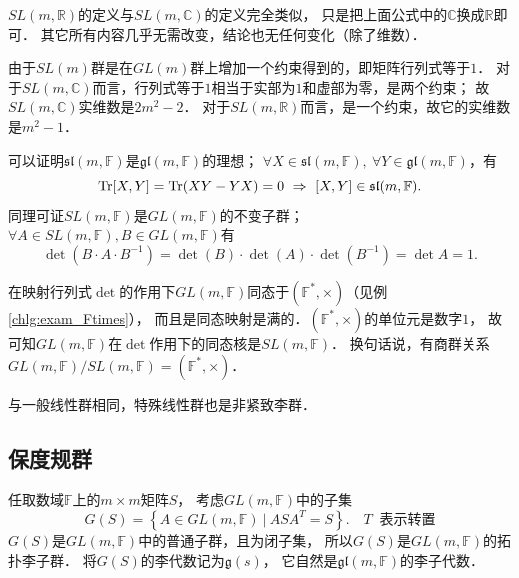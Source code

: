 

$SL(m,\mathbb{R})$的定义与$SL(m,\mathbb{C})$的定义完全类似，
只是把上面公式中的$\mathbb{C}$换成$\mathbb{R}$即可．
其它所有内容几乎无需改变，结论也无任何变化（除了维数）．

由于$SL(m)$群是在$GL(m)$群上增加一个约束得到的，即矩阵行列式等于$1$．
对于$SL(m,\mathbb{C})$而言，行列式等于$1$相当于实部为$1$和虚部为零，是两个约束；
故$SL(m,\mathbb{C})$实维数是$2m^2 -2$．
对于$SL(m,\mathbb{R})$而言，是一个约束，故它的实维数是$m^2-1$．

可以证明$\mathfrak{sl}(m,\mathbb{F})$是$\mathfrak{gl}(m,\mathbb{F})$的{\kaishu 理想}；
$\forall X \in \mathfrak{sl}(m,\mathbb{F}), \  \forall Y \in \mathfrak{gl}(m,\mathbb{F})$，有
\begin{equation}
    {\rm Tr}[X,Y]={\rm Tr}(XY-YX) = 0 \ \Rightarrow \ 
    [X,Y] \in \mathfrak{sl}(m,\mathbb{F}).
\end{equation}
同理可证$SL(m,\mathbb{F})$是$GL(m,\mathbb{F})$的{\kaishu 不变子群}；
$\forall A \in SL(m,\mathbb{F}),  B \in GL(m,\mathbb{F})$有
\begin{equation}
    \det\left(B\cdot A \cdot B^{-1}\right)
    =\det\left(B\right)\cdot\det\left(A\right)\cdot\det\left(B^{-1}\right)
    =\det A =1.
\end{equation}

在映射行列式$\det$的作用下$GL(m,\mathbb{F})$同态于$(\mathbb{F}^*,\times)$（见例\ref{chlg:exam_Ftimes}），
而且是同态映射是满的．$(\mathbb{F}^*,\times)$的单位元是数字$1$，
故可知$GL(m,\mathbb{F})$在$\det$作用下的同态核是$SL(m,\mathbb{F})$．
换句话说，有商群关系$GL(m,\mathbb{F})/SL(m,\mathbb{F})=(\mathbb{F}^*,\times)$．

与一般线性群相同，特殊线性群也是非紧致李群．





\subsection{保度规群}\label{chlg:sec_isometry}


任取数域$\mathbb{F}$上的$m\times m$矩阵$S$，
考虑$GL(m,\mathbb{F})$中的子集
\begin{equation}\label{chlg:eqn_gsinit}
    G(S)= \left\{ A \in GL(m,\mathbb{F})\ |\  A S {A}^T =S \right\}.
    \quad  T\ \text{ 表示转置}
\end{equation}
$G(S)$是$GL(m,\mathbb{F})$中的普通子群，且为闭子集，
所以$G(S)$是$GL(m,\mathbb{F})$的拓扑李子群．
将$G(S)$的李代数记为$\mathfrak{g}(s)$，
它自然是$\mathfrak{gl}(m,\mathbb{F})$的李子代数．

